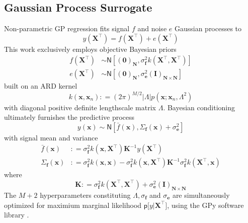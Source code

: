 \documentclass[preprint,12pt]{elsarticle}
\newcommand*{\M}[1]{\ensuremath{#1}\xspace}
\newcommand*{\vr}[1]{\M{\mathbf{#1}}}
\newcommand*{\deq}{\M{\mathrel{\mathop:}=}}
\newcommand*{\gauss}[2]{\mathsf{N}\!\left\lbrack{} #1 , #2 \right\rbrack}
\newcommand*{\modulus}[1]{\M{\left\lvert#1\right\rvert}}
\begin{document}
        \subsection{Gaussian Process Surrogate} \label{sub:Method:GP}
            Non-parametric GP regression fits signal $f$ and noise $e$ Gaussian processes to
            \begin{equation} \label{eq:Method:GP:Problem}
                y(\vr{X}^{\intercal}) = f(\vr{X}^{\intercal}) + e(\vr{X}^{\intercal})
            \end{equation}
            This work exclusively employs objective Bayesian priors
            \begin{align*}
                f(\vr{X}^{\intercal}) &\sim \gauss{(\vr{0})_{\vr{N}}}{\sigma_{\vr{f}}^{2} k(\vr{X}^{\intercal},\vr{X}^{\intercal})} \\
                e(\vr{X}^{\intercal}) &\sim \gauss{(\vr{0})_{\vr{N}}}{\sigma_{\vr{e}}^{2} (\vr{I})_{\vr{N}\times\vr{N}}} 
            \end{align*}
            built on an ARD kernel
            \begin{equation} \label{eq:Method:GP:Kernel}
                k(\vr{x},\vr{x}_{n}) \deq 
                (2 \pi)^{M/2} \modulus{\Lambda} p\!\left(\vr{x} ; \vr{x}_{n}, \Lambda^2\right) 
            \end{equation}
            with diagonal positive definite lengthscale matrix \(\Lambda\).
            Bayesian conditioning ultimately furnishes the predictive process
            \begin{equation*}
                y(\vr{x}) \sim \gauss{\bar{f}(\vr{x})}{\Sigma_{\vr{f}}(\vr{x}) + \sigma_{\vr{e}}^{2}}
            \end{equation*}
            with signal mean and variance
            \begin{equation} \label{eq:Method:GP:MeanAndVariance}
                \begin{aligned}
                    \bar{f}(\vr{x}) &\deq \sigma^{2}_\vr{f} k(\vr{x},\vr{X}^{\intercal})
                    \vr{K}^{-1} y(\vr{X}^{\intercal}) \\
                    \Sigma_{\vr{f}}(\vr{x}) &\deq \sigma^{2}_\vr{f} k(\vr{x},\vr{x})
                    - \sigma^{2}_\vr{f} k(\vr{x},\vr{X}^{\intercal})
                    \vr{K}^{-1} \sigma^{2}_\vr{f} k(\vr{X}^{\intercal},\vr{x})
                \end{aligned}
            \end{equation}
        where
            \begin{equation} \label{eq:Method:GP:KDef}
                \vr{K} \deq \sigma^{2}_\vr{f} k(\vr{X}^{\intercal},\vr{X}^{\intercal}) + \sigma_{\vr{e}}^{2} (\vr{I})_{\vr{N}\times\vr{N}}       
            \end{equation}
        The $M+2$ hyperparameters constituting $\Lambda, \sigma_{\vr{f}}$ and $\sigma_{\vr{e}}$ are simultaneously optimized for maximium marginal likelihood $\mathsf{p}\lbrack y \vert \vr{X}^{\intercal}\rbrack$, using the GPy software library \cite{GPy2020}.
\end{document}
